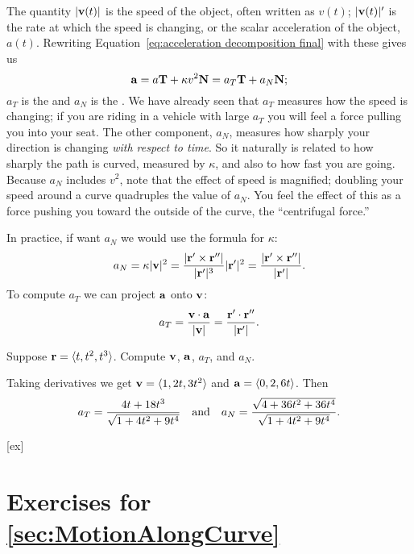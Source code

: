 The quantity $|{\bf v}(t)|$ is the speed of the object, often written as
$v(t)$; $|{\bf v}(t)|'$ is the rate at which the speed is changing, or
the scalar acceleration of the object, $a(t)$. Rewriting 
Equation~\ref{eq:acceleration decomposition final} with these gives
us
$${\bf a}=a{\bf T}+\kappa v^2{\bf N}=
a_{T}{\bf T}+a_{N}{\bf N};$$
$a_T$ is the  and 
$a_N$ is the . 
We have already seen that $a_T$ measures how the speed is changing; if
you are riding in a vehicle with large $a_T$ you will feel a force
pulling you into your seat. The other component, $a_N$, measures how
sharply your direction is changing \emph{with respect to time}. So it
naturally is related to how sharply the path is curved, measured by
$\kappa$, and also to how fast you are going. Because $a_N$ includes
$v^2$, note that the effect of speed is magnified; doubling your speed
around a curve quadruples the value of $a_N$. You feel the effect of
this as a force pushing you toward the outside of the curve, the
``centrifugal force.''

In practice, if want $a_N$ we would use the formula for $\kappa$:
$$a_N=\kappa |{\bf v}|^2= {|{\bf r}'\times{\bf r}''|\over
|{\bf r}'|^3}|{\bf r}'|^2={|{\bf r}'\times{\bf r}''|\over|{\bf r}'|}.$$
To compute $a_T$ we can project ${\bf a}$ onto ${\bf v}$:
$$a_T={{\bf v}\cdot{\bf a}\over|{\bf v}|}={{\bf r}'\cdot{\bf r}''\over
|{\bf r}'|}.$$

\begin{example}{}{}
Suppose ${\bf r}=\langle t,t^2,t^3\rangle$. 
Compute ${\bf v}$, ${\bf a}$,
$a_T$, and $a_N$.
\end{example}
\begin{solution}
Taking derivatives we get
${\bf v}=\langle 1,2t,3t^2\rangle$ 
and ${\bf a}=\langle 0,2,6t\rangle$. Then
$$a_T={4t+18t^3\over \sqrt{1+4t^2+9t^4}}
\quad\hbox{and}\quad
a_N={\sqrt{4+36t^2+36t^4}\over\sqrt{1+4t^2+9t^4}}.$$
\end{solution}


[ex]
\section*{Exercises for \ref{sec:MotionAlongCurve}}

